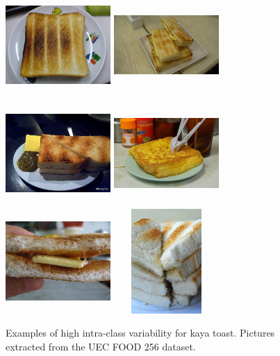 \begin{figure}
    \centering
    \includegraphics[height=4cm, width=4cm]{img/kaya_toast_1.jpg}
    \includegraphics[height=4cm, width=4cm]{img/kaya_toast_2.jpg}
    \includegraphics[height=4cm, width=4cm]{img/kaya_toast_3.jpg}
    \includegraphics[height=4cm, width=4cm]{img/kaya_toast_4.jpg}
    \includegraphics[height=4cm, width=4cm]{img/kaya_toast_5.jpg}
    \includegraphics[height=4cm, width=4cm]{img/kaya_toast_6.jpg}
    \caption[Examples of high intra-class variability for kaya toast]{Examples of high intra-class variability for kaya toast. Pictures extracted from the UEC FOOD 256 dataset.}
    \label{fig:intra-class_variability}
\end{figure}

